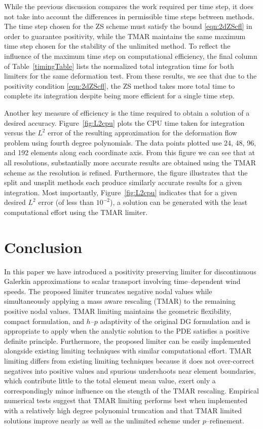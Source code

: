 \documentclass{ametsoc}
\begin{document}
While the previous discussion compares the work required per time step, it does not take into account the differences in permissible time steps between methods. The time step chosen for the ZS scheme must satisfy the bound \eqref{eqn:2dZScfl} in order to guarantee positivity, while the TMAR maintains the same maximum time step chosen for the stability of the unlimited method. To reflect the influence of the maximum time step on computational efficiency, the final column of Table~\ref{timingTable} lists the normalized total integration time for both limiters for the same deformation test. From these results, we see that due to the positivity condition \eqref{eqn:2dZScfl}, the ZS method takes more total time to complete its integration despite being more efficient for a single time step.

Another key measure of efficiency is the time required to obtain a solution of a desired accuracy. Figure~\ref{fig:L2cpu} plots the CPU time taken for integration versus the $L^2$ error of the resulting approximation for the deformation flow problem using fourth degree polynomials. The data points plotted use 24, 48, 96, and 192 elements along each coordinate axis. From this figure we can see that at all resolutions, substantially more accurate results are obtained using the TMAR scheme as the resolution is refined. Furthermore, the figure illustrates that the split and unsplit methods each produce similarly accurate results for a given integration. Most importantly, Figure~\ref{fig:L2cpu} indicates that for a given desired $L^2$ error (of less than $10^{-2}$), a solution can be generated with the least computational effort using the TMAR limiter. 

\section{Conclusion} \label{sec:conc}
In this paper we have introduced a positivity preserving limiter for discontinuous Galerkin approximations to scalar transport involving time--dependent wind speeds. The proposed limiter truncates negative nodal values while simultaneously applying a mass aware rescaling (TMAR) to the remaining positive nodal values. TMAR limiting maintains the geometric flexibility, compact formulation, and $h$--$p$ adaptivity of the original DG formulation and is appropriate to apply when the analytic solution to the PDE satisfies a positive definite principle. Furthermore, the proposed limiter can be easily implemented alongside existing limiting techniques with similar computational effort. TMAR limiting differs from existing limiting techniques because it does not over-correct negatives into positive values and spurious undershoots near element boundaries, which contribute little to the total element mean value, exert only a correspondingly minor influence on the stength of the TMAR rescaling. Empirical numerical tests suggest that TMAR limiting performs best when implemented with a relatively high degree polynomial truncation and that TMAR limited solutions improve nearly as well as the unlimited scheme under $p$--refinement.
\end{document}
